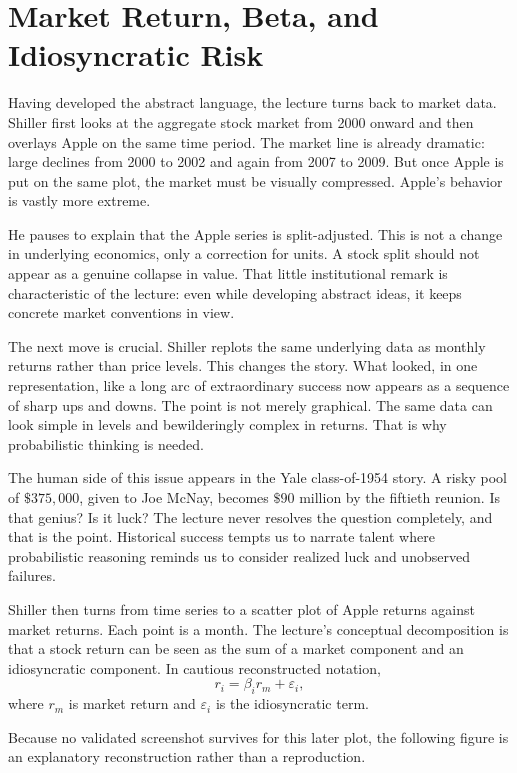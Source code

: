 \section{Market Return, Beta, and Idiosyncratic Risk}

Having developed the abstract language, the lecture turns back to market data. Shiller first looks at the aggregate stock market from 2000 onward and then overlays Apple on the same time period. The market line is already dramatic: large declines from 2000 to 2002 and again from 2007 to 2009. But once Apple is put on the same plot, the market must be visually compressed. Apple's behavior is vastly more extreme.

He pauses to explain that the Apple series is split-adjusted. This is not a change in underlying economics, only a correction for units. A stock split should not appear as a genuine collapse in value. That little institutional remark is characteristic of the lecture: even while developing abstract ideas, it keeps concrete market conventions in view.

The next move is crucial. Shiller replots the same underlying data as monthly returns rather than price levels. This changes the story. What looked, in one representation, like a long arc of extraordinary success now appears as a sequence of sharp ups and downs. The point is not merely graphical. The same data can look simple in levels and bewilderingly complex in returns. That is why probabilistic thinking is needed.

The human side of this issue appears in the Yale class-of-1954 story. A risky pool of \(\$375{,}000\), given to Joe McNay, becomes \(\$90\) million by the fiftieth reunion. Is that genius? Is it luck? The lecture never resolves the question completely, and that is the point. Historical success tempts us to narrate talent where probabilistic reasoning reminds us to consider realized luck and unobserved failures.

Shiller then turns from time series to a scatter plot of Apple returns against market returns. Each point is a month. The lecture's conceptual decomposition is that a stock return can be seen as the sum of a market component and an idiosyncratic component. In cautious reconstructed notation,
\begin{equation}
r_i=\beta_i r_m+\varepsilon_i,
\end{equation}
where \(r_m\) is market return and \(\varepsilon_i\) is the idiosyncratic term.

Because no validated screenshot survives for this later plot, the following figure is an explanatory reconstruction rather than a reproduction.

